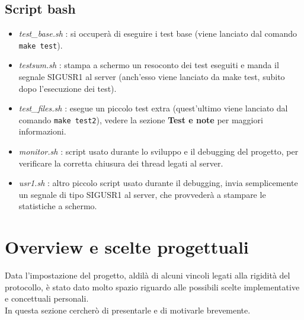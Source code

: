 \subsection{Script bash}
\begin{flushleft}
\begin{itemize}
\item \emph{test\_base.sh} : si occuperà di eseguire i test base (viene lanciato  dal comando \texttt{make test}).

\item \emph{testsum.sh} : stampa a schermo un resoconto dei test eseguiti e manda il segnale SIGUSR1 al server (anch'esso viene lanciato da make test, subito dopo l'esecuzione dei test).

\item \emph{test\_files.sh} : esegue un piccolo test extra (quest'ultimo viene lanciato dal comando \texttt{make test2}), vedere la sezione \textbf{Test e note} per maggiori informazioni.

\item \emph{monitor.sh} : script usato durante lo sviluppo e il debugging del progetto, per verificare la corretta chiusura dei thread legati al server.

\item \emph{usr1.sh} : altro piccolo script usato durante il debugging, invia semplicemente un segnale di tipo SIGUSR1 al server, che provvederà a stampare le statistiche a schermo.

\end{itemize}
\end{flushleft}

\section{Overview e scelte progettuali}
\begin{flushleft}
Data l'impostazione del progetto, aldilà di alcuni vincoli legati alla rigidità del protocollo, è stato dato molto spazio riguardo alle possibili scelte implementative e concettuali personali.\\In questa sezione cercherò di presentarle e di motivarle brevemente.
\end{flushleft}


\vspace{1mm}



